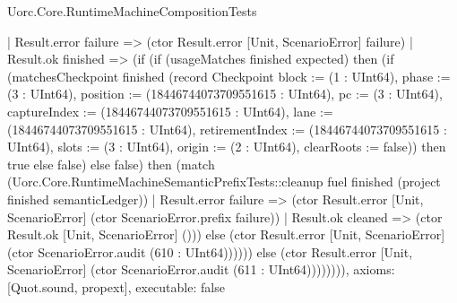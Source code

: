 \begin{lexlean}{Uorc.Core.RuntimeMachineCompositionTests}
\begin{semanticmodule}
{          | Result.error failure => (ctor Result.error [Unit, ScenarioError] failure)
          | Result.ok finished => (if (if (usageMatches finished expected) then (if (matchesCheckpoint finished (record Checkpoint {block := (1 : UInt64), phase := (3 : UInt64), position := (18446744073709551615 : UInt64), pc := (3 : UInt64), captureIndex := (18446744073709551615 : UInt64), lane := (18446744073709551615 : UInt64), retirementIndex := (18446744073709551615 : UInt64), slots := (3 : UInt64), origin := (2 : UInt64), clearRoots := false})) then true else false) else false) then (match (Uorc.Core.RuntimeMachineSemanticPrefixTests::cleanup fuel finished (project finished semanticLedger))
            | Result.error failure => (ctor Result.error [Unit, ScenarioError] (ctor ScenarioError.prefix failure))
            | Result.ok cleaned => (ctor Result.ok [Unit, ScenarioError] ())) else (ctor Result.error [Unit, ScenarioError] (ctor ScenarioError.audit (610 : UInt64)))))) else (ctor Result.error [Unit, ScenarioError] (ctor ScenarioError.audit (611 : UInt64)))))))),
  axioms: [Quot.sound, propext],
  executable: false
}


\end{semanticmodule}
\end{lexlean}
